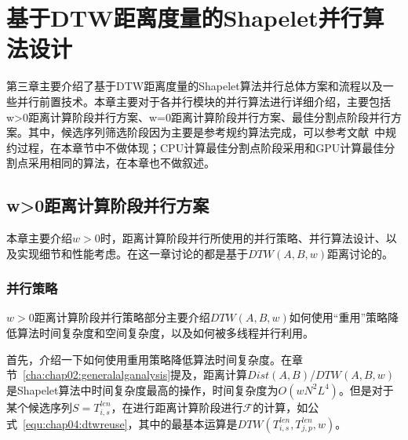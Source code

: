 \chapter{基于DTW距离度量的Shapelet并行算法设计}
\label{cha:chap04:myalg}


第三章主要介绍了基于DTW距离度量的Shapelet算法并行总体方案和流程以及一些并行前置技术。本章主要对于各并行模块的并行算法进行详细介绍，主要包括w>0距离计算阶段并行方案、w=0距离计算阶段并行方案、最佳分割点阶段并行方案。其中，候选序列筛选阶段因为主要是参考规约算法完成，可以参考文献~\cite{harris2007optimizing}中规约过程，在本章节中不做体现；CPU计算最佳分割点阶段采用和GPU计算最佳分割点采用相同的算法，在本章也不做叙述。

\section{w>0距离计算阶段并行方案}
\label{cha:chap04:myalg:DTW}
本章主要介绍$w>0$时，距离计算阶段并行所使用的并行策略、并行算法设计、以及实现细节和性能考虑。在这一章讨论的都是基于$DTW(A,B,w)$距离讨论的。

\subsection{并行策略}

$w>0$距离计算阶段并行策略部分主要介绍$DTW(A,B,w)$如何使用“重用”策略降低算法时间复杂度和空间复杂度，以及如何被多线程并行利用。

首先，介绍一下如何使用重用策略降低算法时间复杂度。在章节~\ref{cha:chap02:generalalganalysis}提及，距离计算$Dist(A,B)$/$DTW(A,B,w)$是Shapelet算法中时间复杂度最高的操作，时间复杂度为$O(wN^2L^4)$。但是对于某个候选序列$S = T_{i,s}^{len}$，在进行距离计算阶段进行$\mathcal{F}$的计算，如公式~\ref{equ:chap04:dtwreuse}，其中的最基本运算是$DTW(T_{i,s}^{len},T_{j,p}^{len},w)$。

